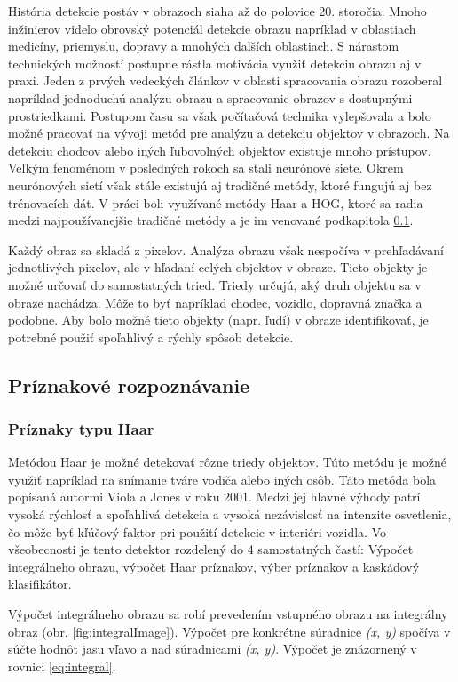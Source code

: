 \documentclass[slovak,master,dept460,male,cpp,cpdeclaration]{diploma}
\begin{document}
História detekcie postáv v obrazoch siaha až do polovice 20. storočia. Mnoho inžinierov videlo obrovský potenciál detekcie obrazu napríklad v oblastiach medicíny, priemyslu, dopravy a mnohých ďalších oblastiach. S nárastom technických možností postupne rástla motivácia využiť detekciu obrazu aj v praxi. Jeden z prvých vedeckých článkov v oblasti spracovania obrazu \cite{rosenfeld1969} rozoberal napríklad jednoduchú analýzu  obrazu a spracovanie obrazov s dostupnými prostriedkami.  Postupom času sa však počítačová technika vylepšovala a bolo možné pracovať na vývoji metód pre analýzu  a detekciu objektov v obrazoch. Na detekciu chodcov alebo iných ľubovolných objektov existuje mnoho prístupov. Veľkým fenoménom v posledných rokoch sa stali neurónové siete. Okrem neurónových sietí však stále existujú aj tradičné metódy, ktoré fungujú aj bez trénovacích dát. V práci boli využívané metódy Haar a HOG, ktoré sa radia medzi najpoužívanejšie tradičné metódy a je im venované podkapitola \ref{Príznakové rozpoznávanie}.\par
Každý obraz sa skladá z pixelov. Analýza obrazu však nespočíva v prehľadávaní jednotlivých pixelov, ale v hľadaní celých objektov v obraze. Tieto objekty je možné  určovať do  samostatných tried. Triedy určujú, aký druh objektu sa v obraze nachádza. Môže to byť napríklad chodec, vozidlo, dopravná značka a podobne. Aby bolo možné tieto objekty (napr. ľudí) v obraze identifikovať, je potrebné použiť spoľahlivý a rýchly spôsob detekcie. 


\subsection{Príznakové rozpoznávanie}
\label{Príznakové rozpoznávanie}
\subsubsection*{Príznaky typu Haar}
Metódou Haar je možné detekovať rôzne triedy objektov. Túto metódu je možné využiť napríklad na snímanie tváre vodiča alebo iných osôb. Táto metóda bola popísaná autormi Viola a Jones\cite{viola2001rapid} v roku 2001. Medzi jej hlavné výhody patrí vysoká rýchlosť  a spoľahlivá detekcia a vysoká nezávislosť na intenzite osvetlenia, čo môže byť kľúčový faktor pri použití detekcie v interiéri vozidla. Vo všeobecnosti je tento detektor rozdelený do 4 samostatných častí: Výpočet integrálneho obrazu,  výpočet Haar príznakov, výber príznakov a kaskádový klasifikátor.\par Výpočet integrálneho obrazu sa robí prevedením vstupného obrazu na integrálny obraz (obr. \ref{fig:integralImage}). Výpočet pre konkrétne súradnice \textit{(x, y)} spočíva v súčte hodnôt jasu vľavo a nad súradnicami  \textit{(x, y)}. Výpočet je znázornený v rovnici \ref{eq:integral}.
\end{document}
